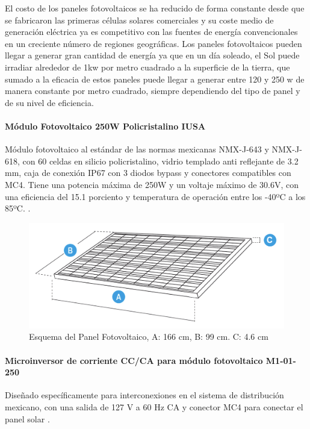 El costo de los paneles fotovoltaicos se ha reducido de forma constante desde que se fabricaron las primeras células solares comerciales y su coste medio de generación eléctrica ya es competitivo con las fuentes de energía convencionales en un creciente número de regiones geográficas.
Los paneles fotovoltaicos pueden llegar a generar gran cantidad de energía ya que en un día soleado, el Sol puede irradiar alrededor de 1kw por metro cuadrado a la superficie de la tierra, que sumado a la eficacia de estos paneles puede llegar a generar entre 120 y 250 w de manera constante por metro cuadrado, siempre dependiendo del tipo de panel y de su nivel de eficiencia.

\paragraph{Módulo Fotovoltaico 250W Policristalino IUSA}
Módulo fotovoltaico al estándar de las normas mexicanas NMX-J-643 y NMX-J-618, con 60 celdas en silicio policristalino, vidrio templado anti reflejante de 3.2 mm, caja de conexión IP67 con 3 diodos bypass y conectores compatibles con MC4.
Tiene una potencia máxima de 250W y un voltaje máximo de 30.6V, con una eficiencia del 15.1 porciento y temperatura de operación entre los -40ºC a los 85ºC. \citep{MarcoTeorico3}.

\begin{figure}[H]
	\centering
	\includegraphics[scale=.25]{Capitulo2/images/panel.png}
	\caption{Esquema del Panel Fotovoltaico, A: 166 cm, B: 99 cm. C: 4.6 cm}
	\label{fig:diagrama_dispensador}
\end{figure}

\paragraph{Microinversor de corriente CC/CA para módulo fotovoltaico M1-01-250}
Diseñado específicamente para interconexiones en el sistema de distribución mexicano, con una salida de 127 V a 60 Hz CA y conector MC4 para conectar el panel solar \citep{MarcoTeorico3}.

